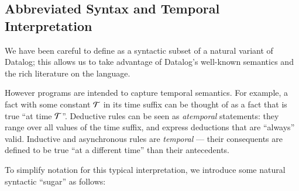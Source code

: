   


\subsection{Abbreviated Syntax and Temporal Interpretation}
\label{sec:abbrvsyntax}

We have been careful to define \slang as a syntactic subset of a natural
variant of Datalog; this allows us to take advantage of Datalog's well-known
semantics and the rich literature on the language.

However \slang programs are intended to capture 
temporal semantics.  For example, a fact with some constant $\Tau$ in its time
suffix can be thought of as a fact that is true ``at time $\Tau$''.  Deductive
rules can be seen as {\em atemporal} statements: they range over all values of
the time suffix, and express deductions that are ``always'' valid.  Inductive
and asynchronous rules are {\em temporal} --- their consequents are defined to
be true ``at a different time'' than their antecedents. 

To simplify \slang notation for this typical interpretation,  we introduce
some natural syntactic ``sugar'' as follows:  

